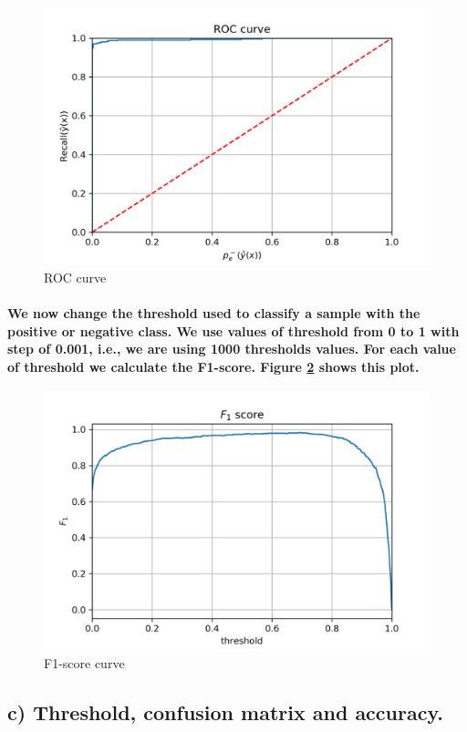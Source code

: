 \documentclass[a4paper]{article}
\begin{document}
\begin{figure}[H]
    \centering
    \includegraphics[width=12cm]{ROC}
    \caption{ROC curve}
    \label{fig:ex1-roc}
\end{figure}

\paragraph{We now change the threshold used to classify a sample with the positive or negative class. We use values of threshold from 0 to 1 with step of 0.001, i.e., we are using 1000 thresholds values. For each value of threshold we calculate the F1-score. Figure \ref{fig:ex1-f1_score} shows this plot.}

\begin{figure}[H]
    \centering
    \includegraphics[width=12cm]{F1_score}
    \caption{F1-score curve}
    \label{fig:ex1-f1_score}
\end{figure}

\subsection{c) Threshold, confusion matrix and accuracy.}
\end{document}
